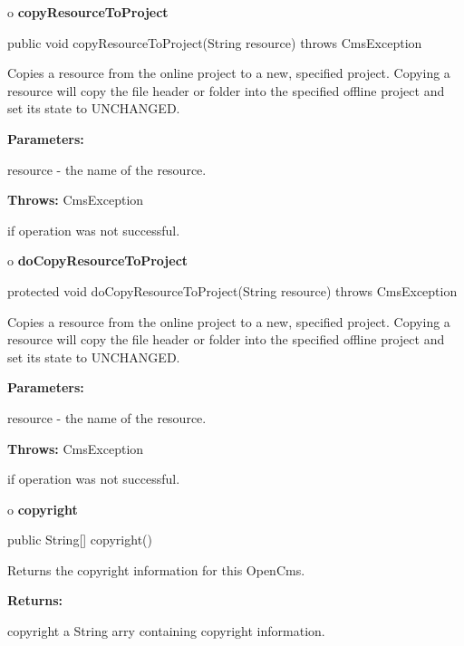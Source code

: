 o {\bf copyResourceToProject}

\begin{PRE}
 public void copyResourceToProject(String resource) throws CmsException
\end{PRE}

\begin{description}
\htmlDD Copies a resource from the online project to a new, specified project.
\htmlBR
Copying a resource will copy the file header or folder into the specified
offline project and set its state to UNCHANGED.

\begin{description}
\item {\bf Parameters:}

resource - the name of the resource.
\item {\bf Throws:} CmsException

if operation was not successful.
\end{description}

\end{description}

o {\bf doCopyResourceToProject}

\begin{PRE}
 protected void doCopyResourceToProject(String resource) throws CmsException
\end{PRE}

\begin{description}
\htmlDD Copies a resource from the online project to a new, specified project.
\htmlBR
Copying a resource will copy the file header or folder into the specified
offline project and set its state to UNCHANGED.

\begin{description}
\item {\bf Parameters:}

resource - the name of the resource.
\item {\bf Throws:} CmsException

if operation was not successful.
\end{description}

\end{description}

o {\bf copyright}

\begin{PRE}
 public String[] copyright()
\end{PRE}

\begin{description}
\htmlDD Returns the copyright information for this OpenCms.

\begin{description}
\item {\bf Returns:}

copyright a String arry containing copyright information.
\end{description}

\end{description}

